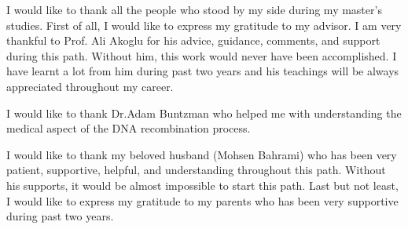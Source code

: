 I would like to thank all the people who stood by my side during my master’s studies. First of all, I would like to express my gratitude to my advisor. I am very thankful to Prof. Ali Akoglu for his advice, guidance, comments, and support during this path. Without him, this work would never have been accomplished. I have learnt a lot from him during past two years and his teachings will be always appreciated throughout my career.

I would like to thank Dr.Adam Buntzman who helped me with understanding the medical aspect of the DNA recombination process.

I would like to thank my beloved husband (Mohsen Bahrami) who has been very patient, supportive, helpful, and  understanding throughout this path. Without his supports, it would be almost impossible to start this path. Last but not least, I would like to express my gratitude to my parents who has been very supportive during past two years. 

